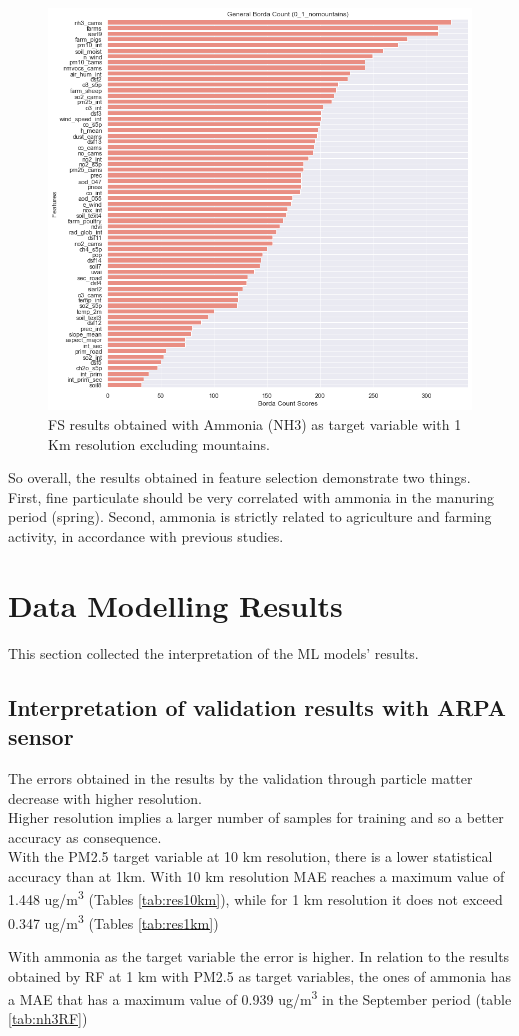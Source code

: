 \begin{figure}[H]
\centering
\includegraphics[scale =0.50]{images/tests/0_1_nomountainsnh3_st.png}
\caption{FS results obtained with Ammonia (NH3) as target variable with 1 Km resolution excluding mountains.}
\label{fig:fs_nh3}
\end{figure}
So overall, the results obtained in feature selection demonstrate two things.\\
First, fine particulate should be very correlated with ammonia in the manuring period (spring). Second, ammonia is strictly related to agriculture and farming activity, in accordance with previous studies.\pagebreak
\section{Data Modelling Results}
\label{sec:modelling2}
This section collected the interpretation of the ML models' results. 
\subsection{Interpretation of validation results with ARPA sensor}
The errors obtained in the results by the validation through particle matter decrease with higher resolution.\\
Higher resolution implies a larger number of samples for training and so a better accuracy as consequence.\\
With the PM2.5 target variable at 10 km resolution, there is a lower statistical accuracy than at 1km.
With 10 km resolution MAE reaches a maximum value of 1.448 ug/m\textsuperscript{3} (Tables \ref{tab:res10km}), while for 1 km resolution it does not exceed 0.347 ug/m\textsuperscript{3} (Tables \ref{tab:res1km})
\par 
With ammonia as the target variable the error is higher.
In relation to the results obtained by RF at 1 km with PM2.5 as target variables, the ones of ammonia has a MAE that has a maximum value of 0.939 ug/m\textsuperscript{3} in the September period (table \ref{tab:nh3RF})

